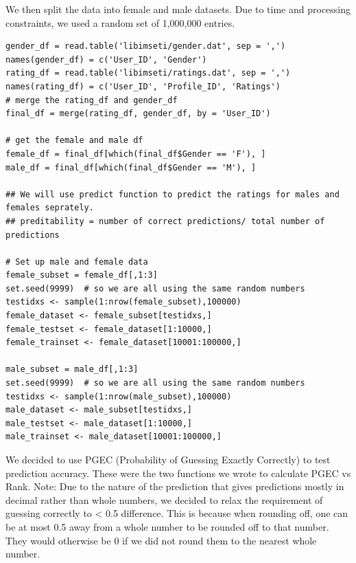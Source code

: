 \documentclass{article}
\begin{document}
We then split the data into female and male datasets. Due to time and processing constraints, we used a random set of 1,000,000 entries. 

\begin{verbatim}
gender_df = read.table('libimseti/gender.dat', sep = ',')
names(gender_df) = c('User_ID', 'Gender')
rating_df = read.table('libimseti/ratings.dat', sep = ',')
names(rating_df) = c('User_ID', 'Profile_ID', 'Ratings')
# merge the rating_df and gender_df
final_df = merge(rating_df, gender_df, by = 'User_ID')

# get the female and male df
female_df = final_df[which(final_df$Gender == 'F'), ]
male_df = final_df[which(final_df$Gender == 'M'), ]

## We will use predict function to predict the ratings for males and females seprately. 
## preditability = number of correct predictions/ total number of predictions

# Set up male and female data
female_subset = female_df[,1:3]
set.seed(9999)  # so we are all using the same random numbers
testidxs <- sample(1:nrow(female_subset),100000)
female_dataset <- female_subset[testidxs,]
female_testset <- female_dataset[1:10000,]
female_trainset <- female_dataset[10001:100000,]

male_subset = male_df[,1:3]
set.seed(9999)  # so we are all using the same random numbers
testidxs <- sample(1:nrow(male_subset),100000)
male_dataset <- male_subset[testidxs,]
male_testset <- male_dataset[1:10000,]
male_trainset <- male_dataset[10001:100000,]
\end{verbatim}

We decided to use PGEC (Probability of Guessing Exactly Correctly) to test prediction accuracy. These were the two functions we wrote to calculate PGEC vs Rank. Note: Due to the nature of the prediction that gives predictions mostly in decimal rather than whole numbers, we decided to relax the requirement of guessing correctly to < 0.5 difference. This is because when rounding off, one can be at most 0.5 away from a whole number to be rounded off to that number. They would otherwise be 0 if we did not round them to the nearest whole number.
\end{document}
